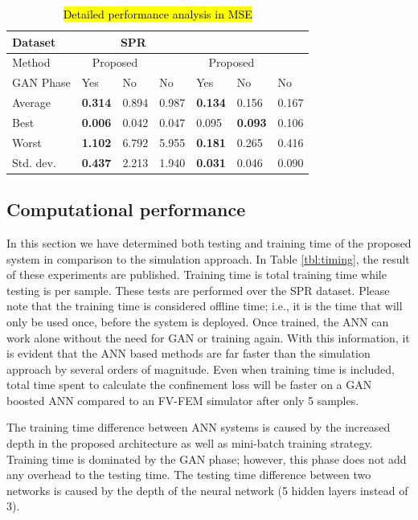 \documentclass[journal]{IEEEtran}
\begin{document}
\begin{table}
	\caption{\hl{Detailed performance analysis in MSE}}
	\centering
	\begin{tabular}{l|l|l|l|l|l|l}
		Dataset & \multicolumn{3}{c|}{SPR} & \multicolumn{3}{c}{\dszero{}} \\\hline
		Method & \multicolumn{2}{c|}{Proposed} & \cite{paper0}  & \multicolumn{2}{c|}{Proposed}   & \cite{paper0} \\\hline
		GAN Phase 			& Yes            & No    &  No     &   Yes            & No             & No    \\\hline
		Average   			& \textbf{0.314} & 0.894 & 0.987   &   \textbf{0.134} & 0.156          & 0.167 \\
		Best      			& \textbf{0.006} & 0.042 & 0.047   &   0.095          & \textbf{0.093} & 0.106 \\
		Worst     			& \textbf{1.102} & 6.792 & 5.955   &   \textbf{0.181} & 0.265          & 0.416 \\
		Std. dev.       	& \textbf{0.437} & 2.213 & 1.940   &   \textbf{0.031} & 0.046          & 0.090 \\
	\end{tabular}
	\label{tbl:all}
\end{table}


\subsection{Computational performance}

In this section we have determined both testing and training time of the proposed system in comparison to the simulation approach. In Table \ref{tbl:timing}, the result of these experiments are published. Training time is total training time while testing is per sample. These tests are performed over the SPR dataset. Please note that the training time is considered offline time; i.e., it is the time that will only be used once, before the system is deployed. Once trained, the ANN can work alone without the need for GAN or training again. With this information, it is evident that the ANN based methods are far faster than the simulation approach by several orders of magnitude. Even when training time is included, total time spent to calculate the confinement loss will be faster on a GAN boosted ANN compared to an FV-FEM simulator after only 5 samples.

The training time difference between ANN systems is caused by the increased depth in the proposed architecture as well as mini-batch training strategy. Training time is dominated by the GAN phase; however, this phase does not add any overhead to the testing time. The testing time difference between two networks is caused by the depth of the neural network (5 hidden layers instead of 3). 
\end{document}

